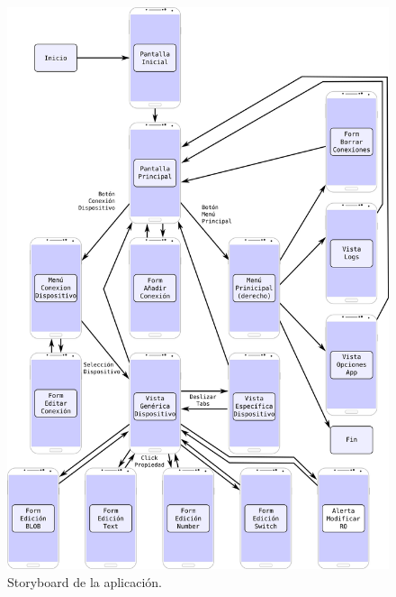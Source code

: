 \begin{figure}[!ht]
  \begin{center}
  \includegraphics[width=1\textwidth]{../images/storyboard.png}
  \caption{Storyboard de la aplicación.}
  \label{fig:storyboard}
  \end{center}
\end{figure}
